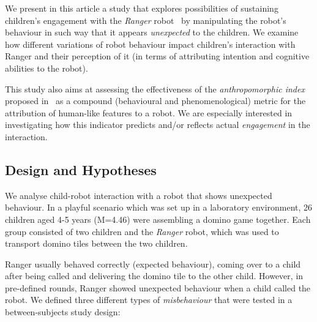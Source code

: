 \documentclass{sig-alternate}
\begin{document}
We present in this article a study that explores possibilities of sustaining
children's engagement with the \emph{Ranger} robot~\cite{mondada2014ranger} by
manipulating the robot's behaviour in such way that it appears
\textit{unexpected} to the children. We examine how different variations of
robot behaviour impact children's interaction with Ranger and their perception of
it (in terms of attributing intention and cognitive abilities to the robot).

This study also aims at assessing the effectiveness of the \emph{anthropomorphic
index} proposed in~\cite{fink2014dynamics} as a compound (behavioural
and phenomenological) metric for the attribution of human-like features to
a robot. We are especially interested in investigating how this indicator predicts
and/or reflects actual \emph{engagement} in the interaction.

\subsection{Design and Hypotheses}

We analyse child-robot interaction with a robot that shows unexpected behaviour.
In a playful scenario which was set up in a laboratory environment, 26 children
aged 4-5 years (M=4.46) were assembling a domino game together. Each group
consisted of two children and the \emph{Ranger} robot, which was used to
transport domino tiles between the two children.

Ranger usually behaved correctly (expected behaviour), coming over to a child
after being called and delivering the domino tile to the other child. However,
in pre-defined rounds, Ranger showed unexpected behaviour when a child called the
robot. We defined three different types of \textit{misbehaviour} that were tested
in a between-subjects study design:
\end{document}
